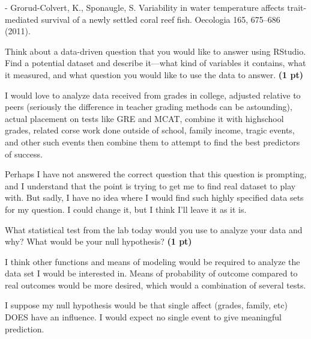 \documentclass[12pt,letterpaper]{article}
\begin{document}
\begin{enumerate}[font=\bfseries, wide, resume]
    - Grorud-Colvert, K., Sponaugle, S. Variability in water temperature affects trait-mediated survival of a newly settled coral reef fish. Oecologia 165, 675–686 (2011). 

    {\color{gray}\item Think about a data-driven question that you would like to answer using RStudio. Find a potential dataset and describe it—what kind of variables it contains, what it measured, and what question you would like to use the data to answer. \textbf{(1 pt)}}\par

    I would love to analyze data received from grades in college, adjusted relative to peers (seriously the difference in teacher grading methods can be astounding), actual placement on tests like GRE and MCAT, combine it with highschool grades, related corse work done outside of school, family income, tragic events, and other such events then combine them to attempt to find the best predictors of success. 

    Perhaps I have not answered the correct question that this question is prompting, and I understand that the point is trying to get me to find real dataset to play with. But sadly, I have no idea where I would find such highly specified data sets for my question. I could change it, but I think I'll leave it as it is.  

    {\color{gray}\item What statistical test from the lab today would you use to analyze your data and why? What would be your null hypothesis? \textbf{(1 pt)}}\par

    I think other functions and means of modeling would be required to analyze the data set I would be interested in. Means of probability of outcome compared to real outcomes would be more desired, which would a combination of several tests. 

    I suppose my null hypothesis would be that single affect (grades, family, etc) DOES have an influence. I would expect no single event to give meaningful prediction.  
\end{enumerate}
\end{document}
